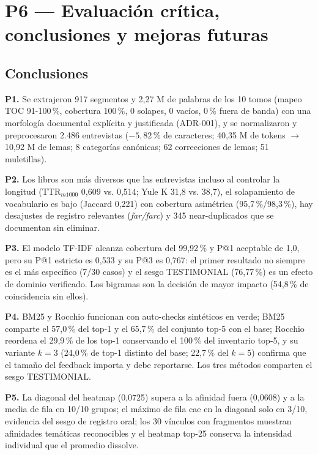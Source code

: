 \documentclass[11pt]{tg_usta}
\begin{document}
\section{P6 --- Evaluación crítica, conclusiones y mejoras futuras}\label{sec:p6}

\subsection{Conclusiones}

\textbf{P1.} Se extrajeron 917 segmentos y 2,27 M de palabras de los 10 tomos (mapeo TOC 91-100\,\%, cobertura 100\,\%, 0 solapes, 0 vacíos, 0\,\% fuera de banda) con una morfología documental explícita y justificada (ADR-001), y se normalizaron y preprocesaron 2.486 entrevistas ($-5{,}82$\,\% de caracteres; 40,35 M de tokens $\rightarrow$ 10,92 M de lemas; 8 categorías canónicas; 62 correcciones de lemas; 51 muletillas).

\textbf{P2.} Los libros son más diversos que las entrevistas incluso al controlar la longitud (TTR$_{m1000}$ 0,609 vs. 0,514; Yule K 31,8 vs. 38,7), el solapamiento de vocabulario es bajo (Jaccard 0,221) con cobertura asimétrica (95,7\,\%/98,3\,\%), hay desajustes de registro relevantes (\textit{far/farc}) y 345 near-duplicados que se documentan sin eliminar.

\textbf{P3.} El modelo TF-IDF alcanza cobertura del 99,92\,\% y P@1 aceptable de 1,0, pero su P@1 estricto es 0,533 y su P@3 es 0,767: el primer resultado no siempre es el más específico (7/30 casos) y el sesgo TESTIMONIAL (76,77\,\%) es un efecto de dominio verificado. Los bigramas son la decisión de mayor impacto (54,8\,\% de coincidencia sin ellos).

\textbf{P4.} BM25 y Rocchio funcionan con auto-checks sintéticos en verde; BM25 comparte el 57,0\,\% del top-1 y el 65,7\,\% del conjunto top-5 con el base; Rocchio reordena el 29,9\,\% de los top-1 conservando el 100\,\% del inventario top-5, y su variante $k=3$ (24,0\,\% de top-1 distinto del base; 22,7\,\% del $k=5$) confirma que el tamaño del feedback importa y debe reportarse. Los tres métodos comparten el sesgo TESTIMONIAL.

\textbf{P5.} La diagonal del heatmap (0,0725) supera a la afinidad fuera (0,0608) y a la media de fila en 10/10 grupos; el máximo de fila cae en la diagonal solo en 3/10, evidencia del sesgo de registro oral; los 30 vínculos con fragmentos muestran afinidades temáticas reconocibles y el heatmap top-25 conserva la intensidad individual que el promedio dissolve.
\end{document}

